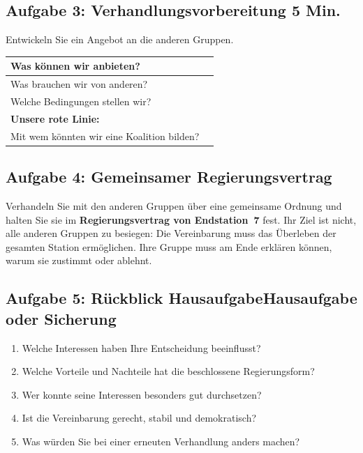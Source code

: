 \ifkurz\else\clearpage\fi
\subsection*{Aufgabe 3: Verhandlungsvorbereitung \ifkurz\else\hfill \normalsize 5 Min.\fi}
Entwickeln Sie ein Angebot an die anderen Gruppen.
\par\smallskip
{\renewcommand{\arraystretch}{1}
\begin{tabular}{|p{4.6cm}|p{\dimexpr\textwidth-4.6cm-4\tabcolsep-3\arrayrulewidth\relax}|}
\hline
\rule{0pt}{\ifkurz 9mm\else 11mm\fi}Was können wir anbieten? & \\ \hline
\rule{0pt}{\ifkurz 9mm\else 11mm\fi}Was brauchen wir von anderen? & \\ \hline
\rule{0pt}{\ifkurz 9mm\else 11mm\fi}Welche Bedingungen stellen wir? & \\ \hline
\rule{0pt}{\ifkurz 9mm\else 11mm\fi}\textbf{Unsere rote Linie:} & \\ \hline
\rule{0pt}{\ifkurz 9mm\else 11mm\fi}Mit wem könnten wir eine Koalition bilden? & \\ \hline
\end{tabular}}

\subsection*{Aufgabe 4: Gemeinsamer Regierungsvertrag}
Verhandeln Sie mit den anderen Gruppen über eine gemeinsame Ordnung und halten Sie sie im \textbf{Regierungsvertrag von Endstation~7} fest. Ihr Ziel ist nicht, alle anderen Gruppen zu besiegen: Die Vereinbarung muss das Überleben der gesamten Station ermöglichen. Ihre Gruppe muss am Ende erklären können, warum sie zustimmt oder ablehnt.

\subsection*{Aufgabe 5: Rückblick \hfill \normalsize\ifkurz Hausaufgabe\else Hausaufgabe oder Sicherung\fi}
\begin{enumerate}
  \item Welche Interessen haben Ihre Entscheidung beeinflusst?
  \item Welche Vorteile und Nachteile hat die beschlossene Regierungsform?
  \item Wer konnte seine Interessen besonders gut durchsetzen?
  \item Ist die Vereinbarung gerecht, stabil und demokratisch?
  \item Was würden Sie bei einer erneuten Verhandlung anders machen?
\end{enumerate}
